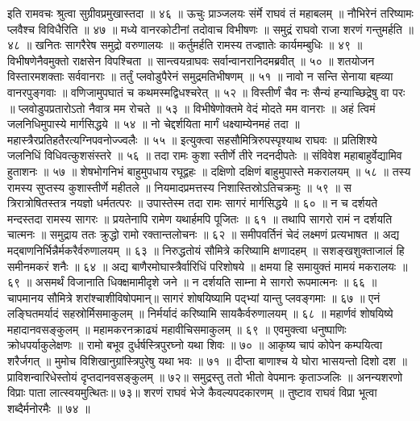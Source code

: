 इति रामवचः श्रुत्वा सुग्रीवप्रमुखास्तदा ॥ ४६ ॥
ऊचुः प्राञ्जलयः संर्मे राघवं तं महाबलम् ॥
नौभिरेनं तरिष्यामः प्लवैश्च विविधैरिति ॥ ४७ ॥
मध्ये वानरकोटीनां तदोवाच विभीषणः ॥
समुद्रं राघवो राजा शरणं गन्तुमर्हति ॥ ४८ ॥
खनितः सागरैरेष समुद्रो वरुणालयः ॥
कर्तुमर्हति रामस्य तज्ज्ञातेः कार्यमम्बुधिः ॥ ४९ ॥
विभीषणेनैवमुक्तो राक्षसेन विपश्चिता ॥
सान्त्वयन्राघवः सर्वान्वानरानिदमब्रवीत् ॥ ५० ॥
शतयोजन विस्तारमशक्ताः सर्ववानराः ॥
तर्तुं प्लवोडुपैरेनं समुद्रमतिभीषणम् ॥ ५१ ॥
नावो न सन्ति सेनाया बह्व्या वानरपुङ्गवाः ॥
वणिजामुपघातं च कथमस्मद्विधश्चरेत् ॥ ५२ ॥
विस्तीर्णं चैव नः सैन्यं हन्याच्छिद्रेषु वा परः ॥
प्लवोडुपप्रतारोऽतो नैवात्र मम रोचते ॥ ५३ ॥
विभीषेणोक्तमे वेदं मोदते मम वानराः ॥
अहं त्विमं जलनिधिमुपास्ये मार्गसिद्धये ॥ ५४ ॥
नो चेद्दर्शयिता मार्गं धक्ष्याम्येनमहं तदा ॥
महास्त्रैरप्रतिहतैरत्यग्निपवनोज्ज्वलैः ॥ ५५ ॥
इत्युक्त्वा सहसौमित्रिरुपस्पृश्याथ राघवः ॥
प्रतिशिश्ये जलनिधिं विधिवत्कुशसंस्तरे ॥ ५६ ॥
तदा रामः कुशा स्तीर्णे तीरे नदनदीपतेः ॥
संविवेश महाबाहुर्वेद्यामिव हुताशनः ॥ ५७ ॥
शेषभोगनिभं बाहुमुपधाय रघूद्वहः ॥
दक्षिणो दक्षिणं बाहुमुपास्ते मकरालयम् ॥ ५८ ॥
तस्य रामस्य सुप्तस्य कुशास्तीर्णे महीतले ॥
नियमादप्रमत्तस्य निशास्तिस्रोऽतिचक्रमुः ॥ ५९ ॥
स त्रिरात्रोषितस्तत्र नयज्ञो धर्मतत्परः ॥
उपास्तेस्म तदा रामः सागरं मार्गसिद्धये ॥ ६० ॥
न च दर्शयते मन्दस्तदा रामस्य सागरः ॥
प्रयतेनापि रामेण यथार्हमपि पूजितः ॥ ६१ ॥
तथापि सागरो रामं न दर्शयति चात्मनः ॥
समुद्राय ततः क्रुद्धो रामो रक्तान्तलोचनः ॥ ६२ ॥
समीपवर्तिनं चेदं लक्ष्मणं प्रत्यभाषत ॥
अद्य मद्बाणनिर्भिन्नैर्मकरैर्वरुणालयम् ॥ ६३ ॥
निरुद्धतोयं सौमित्रे करिष्यामि क्षणादहम् ॥
सशङ्खशुक्ताजालं हि समीनमकरं शनैः ॥ ६४ ॥
अद्य बाणैरमोघास्त्रैर्वारिधिं परिशोषये ॥
क्षमया हि समायुक्तं मामयं मकरालयः ॥ ६९ ॥
असमर्थं विजानाति धिक्क्षमामीदृशे जने ॥
न दर्शयति साम्ना मे सागरो रूपमात्मनः ॥ ६६ ॥
चापमानय सौमित्रे शरांश्चाशीविषोपमान्॥
सागरं शोषयिष्यामि पद्भ्यां यान्तु प्लवङ्गमाः ॥ ६७ ॥
एनं लङ्घितमर्यादं सहस्रोर्मिसमाकुलम् ॥
निर्मर्यादं करिष्यामि सायकैर्वरुणालयम् ॥ ६८ ॥
महार्णवं शोषयिष्ये महादानवसङ्कुलम् ॥
महामकरनक्राढ्यं महावीचिसमाकुलम् ॥ ६९ ॥
एवमुक्त्वा धनुष्पाणिः क्रोधपर्याकुलेक्षणः ॥
रामो बभूव दुर्धर्षस्त्रिपुरघ्नो यथा शिवः ॥ ७० ॥
आकृष्य चापं कोपेन कम्पयित्वा शरैर्जगत् ॥
मुमोच विशिखानुग्रांस्त्रिपुरेषु यथा भवः ॥ ७१ ॥
दीप्ता बाणाश्च ये घोरा भासयन्तो दिशो दश ॥
प्राविशन्वारिधेस्तोयं दृप्तदानवसङ्कुलम् ॥ ७२॥
समुद्रस्तु ततो भीतो वेपमानः कृताञ्जलिः ॥
अनन्यशरणो विप्राः पाता लात्स्वयमुत्थितः॥ ७३॥
शरणं राघवं भेजे कैवल्यपदकारणम् ॥
तुष्टाव राघवं विप्रा भूत्वा शब्दैर्मनोरमैः ॥ ७४ ॥

